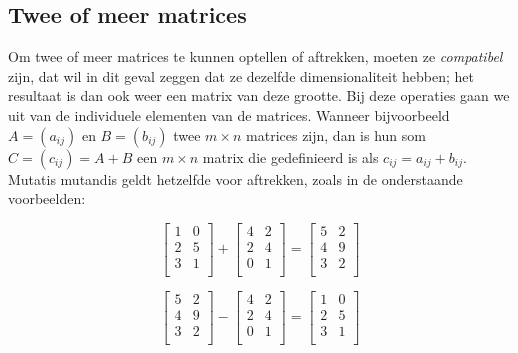 \subsection{Twee of meer matrices}
Om twee of meer matrices te kunnen optellen of aftrekken, moeten ze \textit{compatibel} zijn, dat wil in dit geval zeggen dat ze dezelfde dimensionaliteit hebben; het resultaat is dan ook weer een matrix van deze grootte. Bij deze operaties gaan we uit van de individuele elementen van de matrices. Wanneer bijvoorbeeld $A = (a_{ij})$ en $B = (b_{ij})$ twee $m \times n$ matrices zijn, dan is hun som $C = (c_{ij}) = A + B$ een $m \times n$ matrix die gedefinieerd is als $c_{ij} = a_{ij} + b_{ij}$. Mutatis mutandis geldt hetzelfde voor aftrekken, zoals in de onderstaande voorbeelden:

\[
\begin{bmatrix}
1 & 0 \\
2 & 5 \\
3 & 1 \\
\end{bmatrix} +
\begin{bmatrix}
4 & 2 \\
2 & 4 \\
0 & 1 \\
\end{bmatrix} =
\begin{bmatrix}
5 & 2 \\
4 & 9 \\
3 & 2 \\
\end{bmatrix}
\]

\[
\begin{bmatrix}
5 & 2 \\
4 & 9 \\
3 & 2 \\
\end{bmatrix} -
\begin{bmatrix}
4 & 2 \\
2 & 4 \\
0 & 1 \\
\end{bmatrix} =
\begin{bmatrix}
1 & 0 \\
2 & 5 \\
3 & 1 \\
\end{bmatrix}
\]

